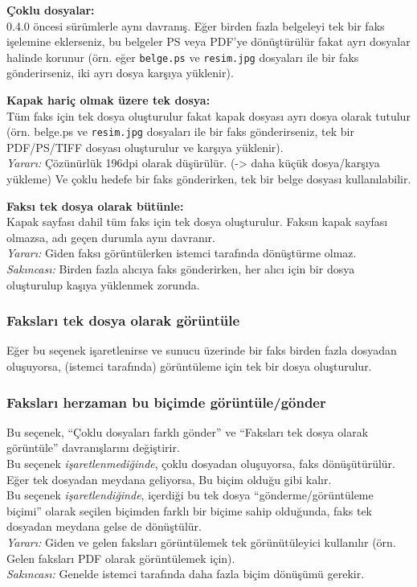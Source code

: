 \documentclass[a4paper,10pt]{scrartcl}
\begin{document}
{\parindent0pt
\textbf{Çoklu dosyalar:}\\
0.4.0 öncesi sürümlerle aynı davranış. Eğer birden fazla belgeleyi tek bir faks işelemine eklerseniz, bu belgeler PS veya PDF'ye dönüştürülür fakat ayrı dosyalar halinde korunur (örn. eğer \texttt{belge.ps} ve \texttt{resim.jpg} dosyaları ile bir faks gönderirseniz, iki ayrı dosya karşıya yüklenir).
\medskip

\textbf{Kapak hariç olmak üzere tek dosya:}\\
Tüm faks için tek dosya oluşturulur fakat kapak dosyası ayrı dosya olarak tutulur (örn. {belge.ps} ve \texttt{resim.jpg} dosyaları ile bir faks gönderirseniz, tek bir PDF/PS/TIFF dosyası oluşturulur ve karşıya yüklenir).\\
\textit{Yararı:} Çözünürlük 196dpi olarak düşürülür. (-> daha küçük dosya/karşıya yükleme) Ve çoklu hedefe bir faks gönderirken, tek bir belge dosyası kullanılabilir.
\medskip

\textbf{Faksı tek dosya olarak bütünle:}\\
Kapak sayfası dahil tüm faks için tek dosya oluşturulur. Faksın kapak sayfası olmazsa, adı geçen durumla aynı davranır.\\
\textit{Yararı:} Giden faksı görüntülerken istemci tarafında dönüştürme olmaz.\\
\textit{Sakıncası:} Birden fazla alıcıya faks gönderirken, her alıcı için bir dosya oluşturulup kaşıya yüklenmek zorunda.
}

\subsubsection{Faksları tek dosya olarak görüntüle}
Eğer bu seçenek işaretlenirse ve sunucu üzerinde bir faks birden fazla dosyadan oluşuyorsa, (istemci tarafında) görüntüleme için tek bir dosya oluşturulur.


\subsubsection{Faksları herzaman bu biçimde görüntüle/gönder}
Bu seçenek, ``Çoklu dosyaları farklı gönder'' ve ``Faksları tek dosya olarak görüntüle'' davranışlarını değiştirir.\\
Bu seçenek \textit{işaretlenmediğinde}, çoklu dosyadan oluşuyorsa, faks dönüşütürülür. Eğer tek dosyadan meydana geliyorsa, Bu biçim olduğu gibi kalır.\\
Bu seçenek \textit{işaretlendiğinde}, içerdiği bu tek dosya ``gönderme/görüntüleme biçimi'' olarak seçilen biçimden farklı bir biçime sahip olduğunda, faks tek dosyadan meydana gelse de dönüştülür.\\
\textit{Yararı:} Giden ve gelen faksları görüntülemek tek görünütüleyici kullanılır (örn. Gelen faksları PDF olarak görüntülemek için).\\
\textit{Sakıncası:} Genelde istemci tarafında daha fazla biçim dönüşümü gerekir.
\end{document}
